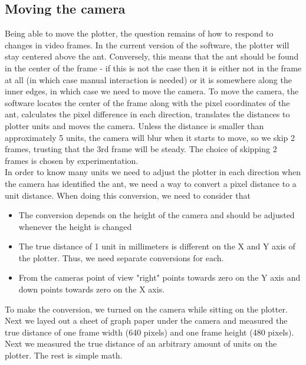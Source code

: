 \subsection{Moving the camera}
Being able to move the plotter, the question remains of how to respond to changes in video frames. In the current version of the software, the plotter will stay centered above the ant. Conversely, this means that the ant should be found in the center of the frame - if this is not the case then it is either not in the frame at all (in which case manual interaction is needed) or it is somewhere along the inner edges, in which case we need to move the camera. To move the camera, the software locates the center of the frame along with the pixel coordinates of the ant, calculates the pixel difference in each direction, translates the distances to plotter units and moves the camera. Unless the distance is smaller than approximately 5 units, the camera will blur when it starts to move, so we skip 2 frames, trusting that the 3rd frame will be steady. The choice of skipping 2 frames is chosen by experimentation.\\

In order to know many units we need to adjust the plotter in each direction when the camera has identified the ant, we need a way to convert a pixel distance to a unit distance. When doing this conversion, we need to consider that

\begin{itemize}
  \item The conversion depends on the height of the camera and should be adjusted whenever the height is changed
  \item The true distance of 1 unit in millimeters is different on the X and Y axis of the plotter. Thus, we need separate conversions for each.
  \item From the cameras point of view "right" points towards zero on the Y axis and down points towards zero on the X axis.
\end{itemize}

To make the conversion, we turned on the camera while sitting on the plotter. Next we layed out a sheet of graph paper under the camera and measured the true distance of one frame width (640 pixels) and one frame height (480 pixels). Next we measured the true distance of an arbitrary amount of units on the plotter. The rest is simple math. \\

